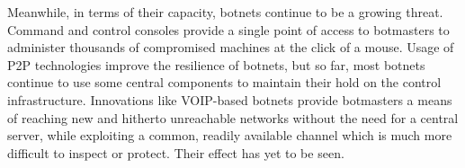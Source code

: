 \documentclass{acm_proc_article-sp}
\begin{document}
Meanwhile, in terms of their capacity, botnets continue to be a growing threat.  Command and control consoles provide a single point of access to botmasters to administer thousands of compromised machines at the click of a mouse.  Usage of P2P technologies improve the resilience of botnets, but so far, most botnets continue to use some central components to maintain their hold on the control infrastructure. Innovations like VOIP-based botnets provide botmasters a means of reaching new and hitherto unreachable networks without the need for a central server, while exploiting a common, readily available channel which is much more difficult to inspect or protect\cite{defcon:voip}.  Their effect has yet to be seen.

\printbibliography{}
\end{document}
